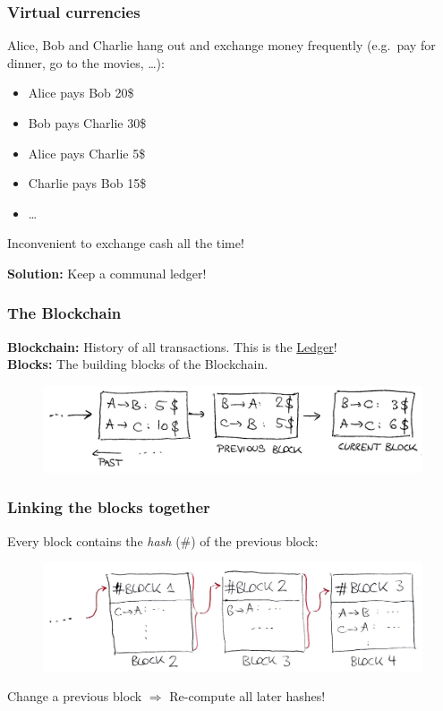 \documentclass[12pt]{beamer}
\theoremstyle{definition}
\numberwithin{equation}{section}
\begin{document}
\begin{frame}
\frametitle{Virtual currencies}
Alice, Bob and Charlie hang out and exchange money frequently (e.g.~pay for dinner, go to the movies, \ldots):
\begin{itemize}
\item Alice pays Bob 20\$
\item Bob pays Charlie 30\$
\item Alice pays Charlie 5\$
\item Charlie pays Bob 15\$
\item \ldots
\end{itemize}
Inconvenient to exchange cash all the time!

\medskip

\textbf{Solution:} Keep a communal ledger!
\end{frame}

\begin{frame}
\frametitle{The Blockchain}
\textbf{Blockchain:} History of all transactions. This is the \underline{Ledger}!\\
\textbf{Blocks:} The building blocks of the Blockchain.


%   
\begin{figure}
\includegraphics[scale=0.2, trim = {45mm 0mm 0mm 0mm}]{fig1}
\end{figure}
\end{frame}

\begin{frame}
\frametitle{Linking the blocks together}
Every block contains the \emph{hash} (\#) of the previous block:

\begin{figure}
\includegraphics[scale=0.28, trim = {100mm 0mm 0mm 0mm}]{fig2.jpg}
\end{figure}
\pause
Change a previous block $\Rightarrow$ Re-compute all later hashes!

\end{frame}
\end{document}
